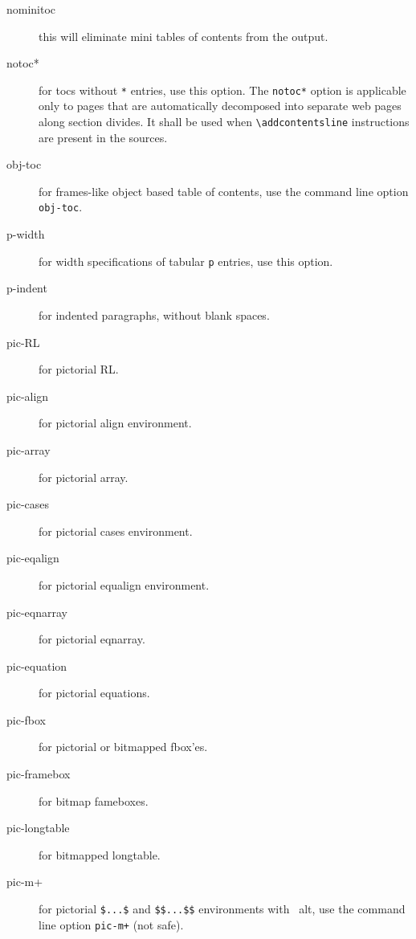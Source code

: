\begin{description}
\item[nominitoc] this will eliminate mini tables of contents from the
  output.

\item[notoc*] for tocs without \verb=*= entries, use this option. The
  \verb=notoc*= option is applicable only to pages that are
  automatically decomposed into separate web pages along section
  divides. It shall be used when \verb=\addcontentsline= instructions
  are present in the sources.

\item[obj-toc] for frames-like object based table of contents, use the
  command line option \verb=obj-toc=.


\item[p-width] for width specifications of tabular \verb=p= entries,
  use this option.

\item[p-indent] for indented paragraphs, without blank spaces.

\item[pic-RL] for pictorial RL.

\item[pic-align] for pictorial align environment.

\item[pic-array] for pictorial array.

\item[pic-cases] for pictorial cases environment.

\item[pic-eqalign] for pictorial equalign environment.

\item[pic-eqnarray] for pictorial eqnarray.

\item[pic-equation] for pictorial equations.

\item[pic-fbox] for pictorial or bitmapped fbox'es.

\item[pic-framebox] for bitmap fameboxes.

\item[pic-longtable] for bitmapped longtable.

\item[pic-m+] for pictorial \verb=$...$= and \verb=$$...$$=
  environments with \latex\ alt, use the command line option
  \verb=pic-m+= (not safe).


\end{description}
